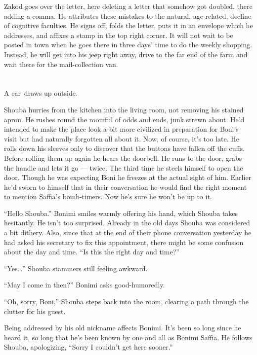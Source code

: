 \documentclass[twoside,11pt,openany]{book}
\begin{document}
Zakod goes over the letter, here deleting a letter that somehow got doubled, there adding a comma. He attributes these
mistakes to the natural, age-related, decline of cognitive faculties.  He signs off, folds the letter, puts it in an
envelope which he addresses, and affixes a stamp in the top right corner. It will not wait to be posted in town when he
goes there in three days{'} time to do the weekly shopping. Instead, he will get into his jeep right away, drive to the
far end of the farm and wait there for the mail-collection van.


\chapter{}

A car~draws up outside.

Shouba hurries from the kitchen into the living room, not removing his stained apron. He rushes round the roomful of
odds and ends, junk strewn about. He'd intended to make the place look a bit more civilized in preparation for Boni's
visit but had naturally forgotten all about it. Now, of course, it's too late. He rolls down his sleeves only to
discover that the buttons have fallen off the cuffs. Before rolling them up again he hears the doorbell. He runs to the
door, grabs the handle and lets it go --- twice. The third time he steels himself to open the door. Though he was
expecting Boni he freezes at the actual sight of him. Earlier he'd sworn to himself that in their conversation he
would find the right moment to mention Saffia's bomb-timers. Now he's sure he won't be up to it.

``Hello Shouba.'' Bonimi smiles warmly offering his hand, which Shouba takes hesitantly. He
isn't too surprised. Already in the old days Shouba was considered a bit dithery.  Also, since that at the end of
their phone conversation yesterday he had asked his secretary to fix this appointment, there might be some confusion
about the day and time. ``Is this the right day and time?''

``Yes{\ldots}'' Shouba stammers still feeling awkward.

``May I come in then?'' Bonimi asks good-humoredly.

``Oh, sorry, Boni,'' Shouba steps back into the room, clearing a path through
the clutter for his guest.

Being addressed by his old nickname affects Bonimi. It's been so long since he heard it, so long that he's been known
by{ }one and all as Bonimi Saffia. He follows Shouba, apologizing, ``Sorry I
couldn't get here sooner.''
\end{document}
